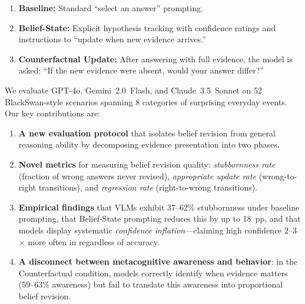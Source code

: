 \begin{enumerate}[leftmargin=*, nosep, topsep=2pt]
    \item \textbf{Baseline:} Standard ``select an answer'' prompting.
    \item \textbf{Belief-State:} Explicit hypothesis tracking with confidence ratings and instructions to ``update when new evidence arrives.''
    \item \textbf{Counterfactual Update:} After answering with full evidence, the model is asked: ``If the new evidence were absent, would your answer differ?''
\end{enumerate}

We evaluate GPT-4o, Gemini~2.0~Flash, and Claude~3.5~Sonnet on 52 BlackSwan-style scenarios spanning 8 categories of surprising everyday events.  Our key contributions are:

\begin{enumerate}[leftmargin=*, nosep, topsep=2pt]
    \item \textbf{A new evaluation protocol} that isolates belief revision from general reasoning ability by decomposing evidence presentation into two phases.
    \item \textbf{Novel metrics} for measuring belief revision quality: \emph{stubbornness rate} (fraction of wrong answers never revised), \emph{appropriate update rate} (wrong-to-right transitions), and \emph{regression rate} (right-to-wrong transitions).
    \item \textbf{Empirical findings} that VLMs exhibit 37--62\% stubbornness under baseline prompting, that Belief-State prompting reduces this by up to 18~pp, and that models display systematic \emph{confidence inflation}---claiming high confidence 2--3$\times$ more often in \phaseB regardless of accuracy.
    \item \textbf{A disconnect between metacognitive awareness and behavior}: in the Counterfactual condition, models correctly identify when evidence matters (59--63\% awareness) but fail to translate this awareness into proportional belief revision.
\end{enumerate}
